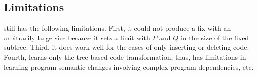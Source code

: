 \subsection{Limitations}
\label{sec:limitations}

{\tool} still has the following limitations. 
First, it could not produce a fix with an
arbitrarily large size because it sets a limit with $P$ and $Q$ in the
size of the fixed subtree. Third, it does work well for the cases of
only inserting or deleting code. Fourth, {\tool} learns only the
tree-based code transformation, thus, has limitations in learning
program semantic changes involving complex program dependencies, etc.
